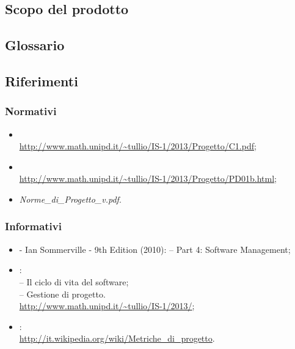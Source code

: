 \subsection{Scopo del prodotto}
\label{1.2}
\Prodotto{}

\subsection{Glossario}
\label{1.3}
\Glossario{}

\subsection{Riferimenti}
\label{1.4}
\subsubsection{Normativi}
\label{1.4.1}
\begin{itemize}
\item {}\\ \url{http://www.math.unipd.it/~tullio/IS-1/2013/Progetto/C1.pdf};
\item {}\\ \url{http://www.math.unipd.it/~tullio/IS-1/2013/Progetto/PD01b.html};
\item {} \emph{Norme\_{}di\_{}Progetto\_{}v\versioneNormeDiProgetto{}.pdf}.\\
\end{itemize}

\subsubsection{Informativi}
\label{1.4.2}
\begin{itemize}
\item {} - Ian Sommerville - 9th Edition (2010):
– Part 4: Software Management;
\item {}:\\
– Il ciclo di vita del software;\\
– Gestione di progetto.\\
\url{http://www.math.unipd.it/~tullio/IS-1/2013/};
\item {}:\\
\url{http://it.wikipedia.org/wiki/Metriche_di_progetto}.
\end{itemize}


